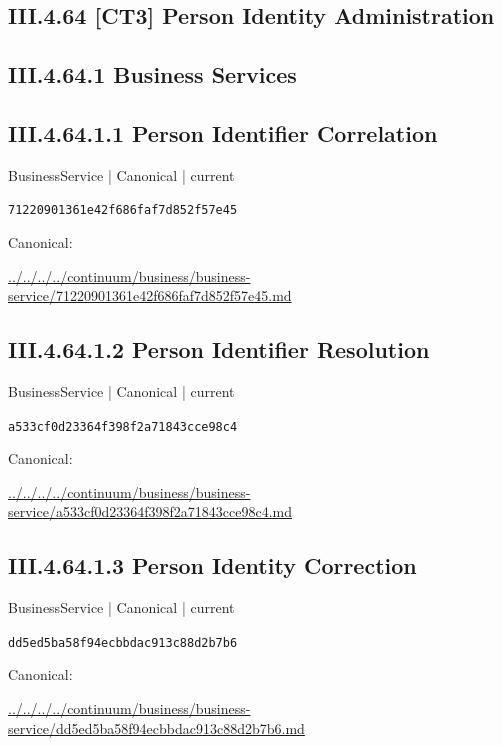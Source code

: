 \documentclass[10pt,a4paper]{article}
\begin{document}
\subsection*{III.4.64 [CT3] Person Identity Administration}
\subsection*{III.4.64.1 Business Services}
\subsection*{III.4.64.1.1 Person Identifier Correlation}
{\small BusinessService | Canonical | current}\par
\texttt{71220901361e42f686faf7d852f57e45}\par
Canonical: \par
{\footnotesize\url{../../../../continuum/business/business-service/71220901361e42f686faf7d852f57e45.md}}\par
\subsection*{III.4.64.1.2 Person Identifier Resolution}
{\small BusinessService | Canonical | current}\par
\texttt{a533cf0d23364f398f2a71843cce98c4}\par
Canonical: \par
{\footnotesize\url{../../../../continuum/business/business-service/a533cf0d23364f398f2a71843cce98c4.md}}\par
\subsection*{III.4.64.1.3 Person Identity Correction}
{\small BusinessService | Canonical | current}\par
\texttt{dd5ed5ba58f94ecbbdac913c88d2b7b6}\par
Canonical: \par
{\footnotesize\url{../../../../continuum/business/business-service/dd5ed5ba58f94ecbbdac913c88d2b7b6.md}}\par
\end{document}
